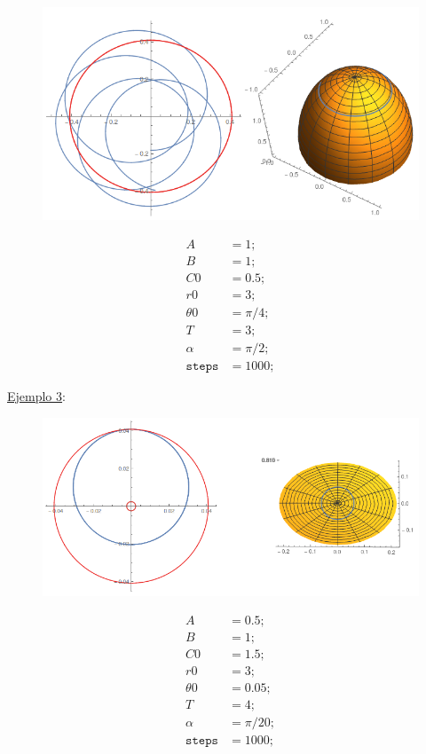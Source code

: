 \documentclass[a4paper,10pt]{article}
\numberwithin{equation}{section}
\begin{document}
\begin{multicols}{2}

\begin{figure}[H]
\center
\includegraphics[scale=0.35]{problema5fig3}
\label{fig:problema5fig3}
\end{figure}

\begin{align*}
 A &= 1; \\
 B &= 1; \\
 C0 &= 0.5; \\ 
 r0 &= 3; \\
 \theta 0 &= \pi/4; \\
 T &= 3; \\
 \alpha &= \pi/2; \\ 
 \texttt{steps} &= 1000;
\end{align*}

\end{multicols}

\underline{Ejemplo 3}:

\begin{multicols}{2}

\begin{figure}[H]
\center
\includegraphics[scale=0.35]{problema5fig4}
\label{fig:problema5fig4}
\end{figure}

\begin{align*}
 A &= 0.5; \\
 B &= 1; \\
 C0 &= 1.5; \\ 
 r0 &= 3; \\
 \theta 0 &= 0.05; \\
 T &= 4; \\
 \alpha &= \pi/20; \\ 
 \texttt{steps} &= 1000;
\end{align*}

\end{multicols}
\end{document}
